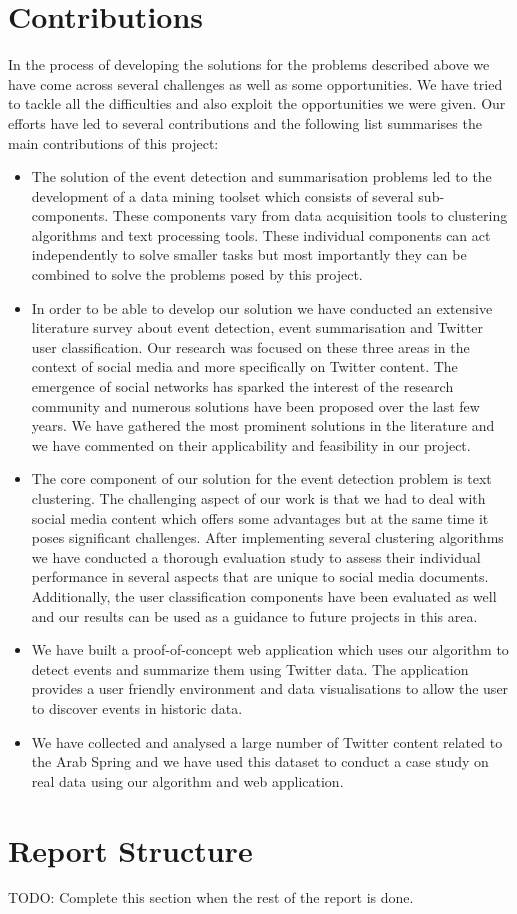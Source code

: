 \section{Contributions}
In the process of developing the solutions for the problems described above we have come across several
challenges as well as some opportunities. We have tried to tackle all the difficulties and also exploit the 
opportunities we were given. Our efforts have led to several contributions and the following list summarises the main contributions of this project:
\begin{itemize}
 \item The solution of the event detection and summarisation problems led to the development of a data mining toolset which consists of 
 several sub-components. These components vary from data acquisition tools to clustering algorithms and text processing tools. These
 individual components can act independently to solve smaller tasks but most importantly they can be combined to solve the problems posed 
 by this project.  
 \item In order to be able to develop our solution we have conducted an extensive literature survey about event detection, event summarisation and Twitter user classification. 
 Our research was focused on these three areas in the context of social media and more specifically on Twitter content. The emergence of social networks has sparked the interest of the research community and 
 numerous solutions have been proposed over the last few years. We have gathered the most prominent solutions in the literature and we have commented on their applicability and 
 feasibility in our project.
 \item The core component of our solution for the event detection problem is text clustering. The challenging aspect of our work is that we had to deal with social media content
 which offers some advantages but at the same time it poses significant challenges. After implementing several clustering algorithms we have conducted a thorough evaluation study to assess their individual performance in several aspects that are unique to social media documents. Additionally, the user classification components have been evaluated as well and our results can be used as a guidance to future projects in this area.      
 \item We have built a proof-of-concept web application which uses our algorithm to detect events and summarize them using Twitter data. The application provides a user friendly
 environment and data visualisations to allow the user to discover events in historic data.
 \item We have collected and analysed a large number of Twitter content related to the Arab Spring and we have used this dataset to conduct a case study on real data using
 our algorithm and web application.  	 
\end{itemize}\vspace{15pt}
\section{Report Structure}
TODO: Complete this section when the rest of the report is done.


